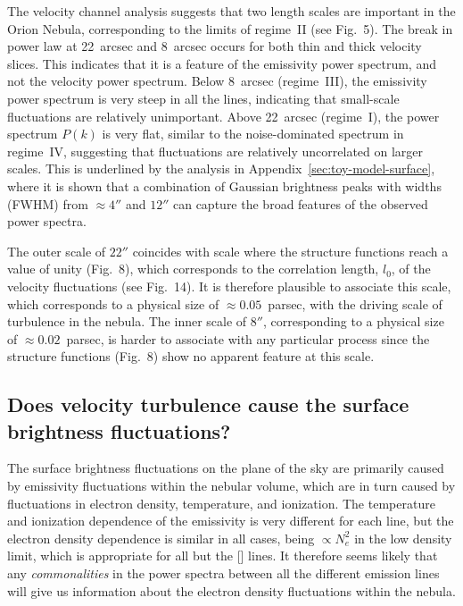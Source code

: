 \documentclass[useAMS,usenatbib]{mnras}
\newcommand\sii{[\ion{S}{ii}]}
\begin{document}
The velocity channel analysis suggests that two length scales are
important in the Orion Nebula, corresponding to the limits of
regime~II (see Fig.~5). The break in power law at 22~arcsec and
8~arcsec occurs for both thin and thick velocity slices. This
indicates that it is a feature of the emissivity power spectrum, and
not the velocity power spectrum. Below 8~arcsec (regime~III), the
emissivity power spectrum is very steep in all the lines, indicating
that small-scale fluctuations are relatively unimportant.  Above
22~arcsec (regime~I), the power spectrum \(P(k)\) is very flat,
similar to the noise-dominated spectrum in regime~IV, suggesting that
fluctuations are relatively uncorrelated on larger scales.  This is
underlined by the analysis in Appendix~\ref{sec:toy-model-surface},
where it is shown that a combination of Gaussian brightness peaks with
widths (FWHM) from \(\approx 4''\) and \(12''\) can capture the broad
features of the observed power spectra.%

The outer scale of \(22''\) coincides with scale where the structure
functions reach a value of unity (Fig.~8), which corresponds to the
correlation length, \(l_0\), of the velocity fluctuations (see
Fig.~14).  It is therefore plausible to associate this scale, which
corresponds to a physical size of \(\approx 0.05\)~parsec, with the
driving scale of turbulence in the nebula.  The inner scale of
\(8''\), corresponding to a physical size of \(\approx 0.02\)~parsec,
is harder to associate with any particular process since the structure
functions (Fig.~8) show no apparent feature at this scale.

\subsection{Does velocity turbulence cause the surface brightness
  fluctuations?}
\label{sec:does-veloc-turb}

The surface brightness fluctuations on the plane of the sky are
primarily caused by emissivity fluctuations within the nebular volume,
which are in turn caused by fluctuations in electron density,
temperature, and ionization.  The temperature and ionization
dependence of the emissivity is very different for each line, but the
electron density dependence is similar in all cases, being
\(\propto N_e^2\) in the low density limit, which is appropriate for
all but the \sii{} lines.  It therefore seems likely that any
\emph{commonalities} in the power spectra between all the different
emission lines will give us information about the electron density
fluctuations within the nebula.
\end{document}
